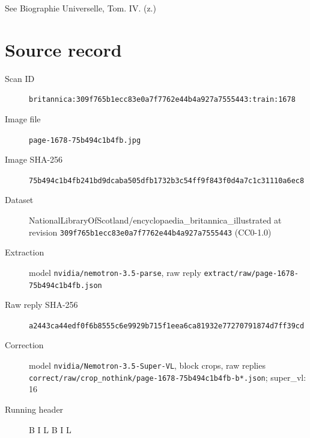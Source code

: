 \documentclass{article}
\begin{document}
See Biographie Universelle, Tom. IV. (z.)


\section*{Source record}
\begin{description}
\item[Scan ID] \texttt{britannica:309f765b1ecc83e0a7f7762e44b4a927a7555443:train:1678}
\item[Image file] \texttt{page-1678-75b494c1b4fb.jpg}
\item[Image SHA-256] \texttt{75b494c1b4fb241bd9dcaba505dfb1732b3c54ff9f843f0d4a7c1c31110a6ec8}
\item[Dataset] NationalLibraryOfScotland/encyclopaedia\_britannica\_illustrated at revision \texttt{309f765b1ecc83e0a7f7762e44b4a927a7555443} (CC0-1.0)
\item[Extraction] model \texttt{nvidia/nemotron-3.5-parse}, raw reply \texttt{extract/raw/page-1678-75b494c1b4fb.json}
\item[Raw reply SHA-256] \texttt{a2443ca44edf0f6b8555c6e9929b715f1eea6ca81932e77270791874d7ff39cd}
\item[Correction] model \texttt{nvidia/Nemotron-3.5-Super-VL}, block crops, raw replies \texttt{correct/raw/crop\_nothink/page-1678-75b494c1b4fb-b*.json}; super\_vl: 16
\item[Running header] B I L B I L
\end{description}
\end{document}
